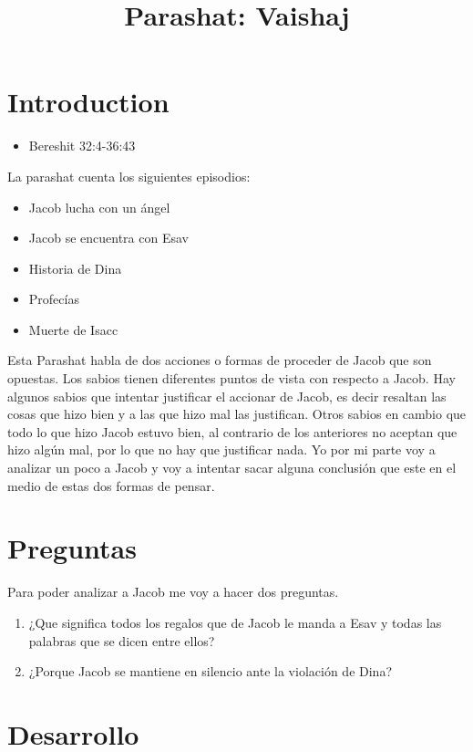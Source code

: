 \documentclass[conference]{IEEEtran}
\title{Parashat: Vaishaj\\ \textit{}}
\author{\IEEEauthorblockN{Kunst, James Jules Waldemar}
\IEEEauthorblockA{Bet-Melej Haba}}
\begin{document}
\maketitle


\section{Introduction}
\begin{itemize}
\item
Bereshit 32:4-36:43
\end{itemize}

La parashat cuenta los siguientes episodios:
\begin{itemize}
\item
Jacob lucha con un ángel
\item
Jacob se encuentra con Esav
\item
Historia de Dina
\item
Profecías
\item
Muerte de Isacc
\end{itemize}

Esta Parashat habla de dos acciones o formas de proceder de Jacob que son opuestas.
Los sabios tienen diferentes puntos de vista con respecto a Jacob.
Hay algunos sabios que intentar justificar el accionar de Jacob, es decir resaltan las cosas que hizo bien y a las que hizo mal las justifican. Otros sabios en cambio que todo lo que hizo Jacob estuvo bien, al contrario de los anteriores no aceptan que hizo algún mal, por lo que no hay que justificar nada.
Yo por mi parte voy a analizar un poco a Jacob y voy a intentar sacar alguna conclusión que este en el medio de estas dos formas de pensar.



\section{Preguntas}
Para poder analizar a Jacob me voy a hacer dos preguntas.
\begin{enumerate}
\item ¿Que significa todos los regalos que de Jacob le manda a Esav y todas las palabras que se dicen entre ellos?
\item ¿Porque Jacob se mantiene en silencio ante la violación de Dina?
\end{enumerate}



\section{Desarrollo}
\end{document}
